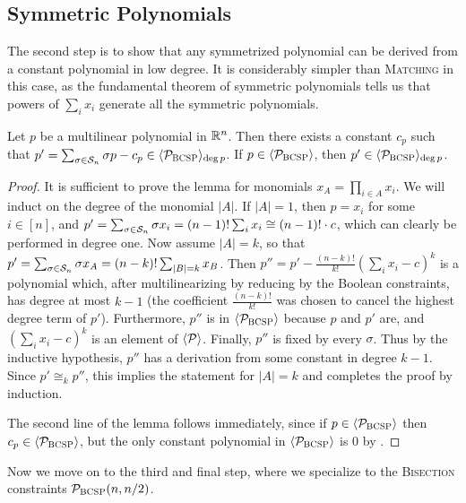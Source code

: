 \subsection{Symmetric Polynomials}
The second step is to show that any symmetrized polynomial can be derived from a constant polynomial in low degree. It is considerably simpler than \textsc{Matching} in this case, as the fundamental theorem of symmetric polynomials tells us that powers of $\sum_i x_i$ generate all the symmetric polynomials. 
\begin{lemma}\label{lem:bcsp-symmetric}
Let $p$ be a multilinear polynomial in $\mathbb R^n$. Then there exists a constant $c_p$ such that $p' = \sum_{\sigma \in \mathcal S_n} \sigma p - c_p \in \langle \mathcal P_{\textsc{BCSP}} \rangle_{\deg p}$. If $p \in \langle \mathcal P_{\textsc{BCSP}} \rangle$, then $p' \in \langle \mathcal P_{\textsc{BCSP}} \rangle_{\deg p}$.
\end{lemma}
\begin{proof}
It is sufficient to prove the lemma for monomials $x_A = \prod_{i \in A} x_i$. We will induct on the degree of the monomial $|A|$. 
If $|A| = 1$, then $p = x_i$ for some $i \in [n]$, and $p' = \sum_{\sigma \in \mathcal S_n} \sigma x_i = (n-1)!\sum_i x_i \cong (n-1)!\cdot c$, which can clearly be performed in degree one. Now assume $|A| = k$, so that $p' = \sum_{\sigma \in \mathcal S_n} \sigma x_A = (n-k)! \sum_{|B|=k} x_B$. Then $p'' = p' - \frac{(n-k)!}{k!}\left(\sum_i x_i - c\right)^k$ is a polynomial which, after multilinearizing by reducing by the Boolean constraints, has degree at most $k-1$ (the coefficient $\frac{(n-k)!}{k!}$ was chosen to cancel the highest degree term of $p'$). Furthermore, $p''$ is in $\langle \mathcal P_{\textsc{BCSP}} \rangle$ because $p$ and $p'$ are, and $(\sum_i x_i - c)^k$ is an element of $\langle \mathcal P \rangle$. Finally, $p''$ is fixed by every $\sigma$. Thus by the inductive hypothesis, $p''$ has a derivation from some constant in degree $k-1$. Since $p' \cong_k p''$, this implies the statement for $|A| = k$ and completes the proof by induction.

The second line of the lemma follows immediately, since if $p \in \langle \mathcal P_{\textsc{BCSP}} \rangle$ then $c_p \in \langle \mathcal P_{\textsc{BCSP}} \rangle$, but the only constant polynomial in $\langle \mathcal P_{\textsc{BCSP}} \rangle$ is $0$ by .
\end{proof}
Now we move on to the third and final step, where we specialize to the \textsc{Bisection} constraints $\mathcal P_{\textsc{BCSP}}(n,n/2)$.

